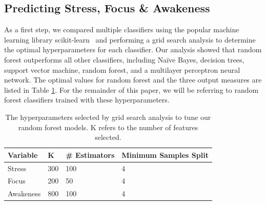 \subsection{Predicting Stress, Focus \& Awakeness}
\label{secOverallAccuracy}
As a first step, we compared multiple classifiers using the popular machine learning library scikit-learn~\cite{pedregosa11} and performing a grid search analysis to determine the optimal hyperparameters for each classifier. Our analysis showed that random forest outperforms all other classifiers, including Na\"ive Bayes, decision trees, support vector machine, random forest, and a multilayer perceptron neural network. The optimal values for random forest and the three output measures are listed in Table \ref{tab:hyperparams}. For the remainder of this paper, we will be referring to random forest classifiers trained with these hyperparameters.%
\begin{table}[h]
	\begin{centering}
	\small\addtolength{\tabcolsep}{-1pt}
    \begin{tabular}{llll}
      \hline
      Variable & K & \# Estimators & Minimum Samples Split \\
      \hline
      Stress & 300 & 100 & 4\\
      Focus & 200 & 50 & 4\\
      Awakeness & 800 & 100 & 4\\
      \hline
    \end{tabular}
    \caption{The hyperparameters selected by grid search analysis to tune our random forest models. K refers to the number of features selected.}    \label{tab:hyperparams}
    \end{centering}
\end{table}



